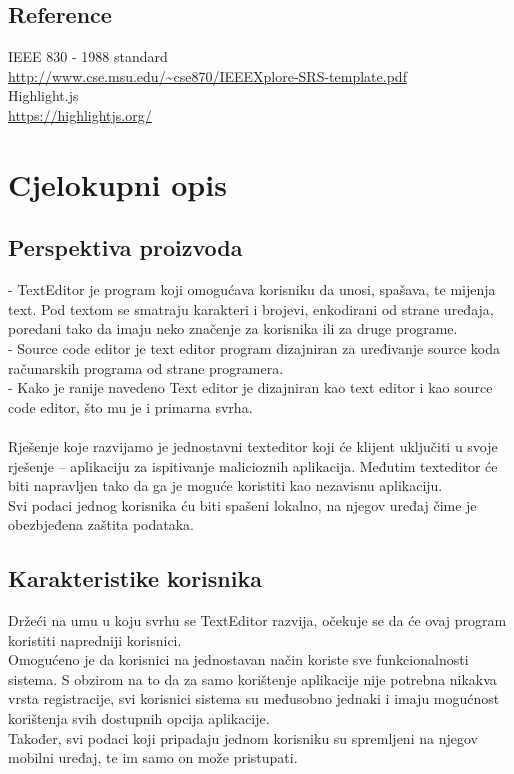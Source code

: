 \documentclass[utf8]{article}
\begin{document}
\subsection{Reference}
IEEE 830 - 1988 standard\\
\url{http://www.cse.msu.edu/~cse870/IEEEXplore-SRS-template.pdf}\\
Highlight.js\\
\url{https://highlightjs.org/}\\

\section{Cjelokupni opis}
\subsection{Perspektiva proizvoda}
- TextEditor je program koji omogućava korisniku da unosi, spašava, te mijenja text. Pod textom se smatraju karakteri i brojevi, enkodirani od strane uređaja, poredani tako da imaju neko značenje za korisnika ili za druge programe.\\
- Source code editor je text editor program dizajniran za uređivanje source koda računarskih programa od strane programera.\\
- Kako je ranije navedeno Text editor je dizajniran kao text editor i kao source code editor, što mu je i primarna svrha.\\
\\
Rješenje koje razvijamo je jednostavni texteditor koji će klijent uključiti u svoje rješenje – aplikaciju za ispitivanje malicioznih aplikacija. Međutim texteditor će biti napravljen tako da ga je moguće koristiti kao nezavisnu aplikaciju. \\
Svi podaci jednog korisnika ću biti spašeni lokalno, na njegov uređaj čime je obezbjeđena zaštita podataka.

\subsection{Karakteristike korisnika}
Držeći na umu u koju svrhu se TextEditor razvija, očekuje se da će ovaj program koristiti napredniji korisnici. \\
Omogućeno je da korisnici na jednostavan način koriste sve funkcionalnosti sistema. S obzirom na to da za samo korištenje aplikacije nije potrebna nikakva vrsta registracije, svi korisnici sistema su međusobno jednaki i imaju mogućnost korištenja svih dostupnih opcija aplikacije.\\
Također, svi podaci koji pripadaju jednom korisniku su spremljeni na njegov mobilni uređaj, te im samo on može pristupati.
\end{document}
